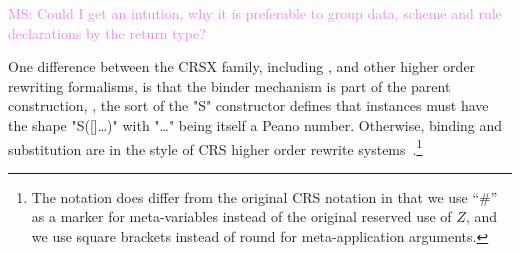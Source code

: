 \documentclass[letterpaper,11pt]{article}
\newcommand{\MS}[1]{\textcolor{violet}{MS: #1}}
\begin{document}
\MS{Could I get an intution, why it is preferable to group data, scheme and rule declarations by the
  return type?}

\begin{remark}
  One difference between the CRSX family, including \hax, and other higher order rewriting
  formalisms, is that the binder mechanism is part of the parent construction, \eg, the sort of the
  "S" constructor defines that instances must have the shape "S([]…)" with "…" being itself a Peano
  number.  Otherwise, binding and substitution are in the style of CRS higher order rewrite
  systems~\cite{Klop+:tcs1993}.\footnote{The notation does differ from the original CRS notation in
    that we use ``\#'' as a marker for meta-variables instead of the original reserved use of $Z$,
    and we use square brackets instead of round for meta-application arguments.}
\end{remark}
\end{document}
